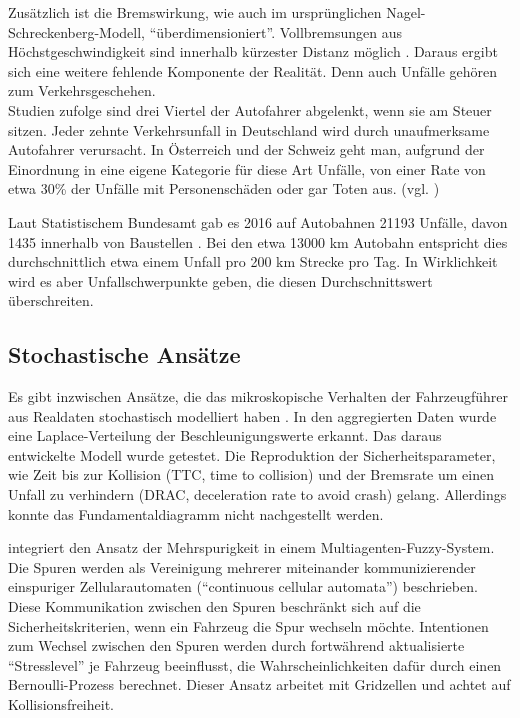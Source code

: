 Zusätzlich ist die Bremswirkung, wie auch im ursprünglichen Nagel-Schreckenberg-Modell, \enquote{über\-di\-men\-sio\-niert}. 
Vollbremsungen aus Höchstgeschwindigkeit sind innerhalb kürzester Distanz möglich \cite{acc-free}.
Daraus ergibt sich eine weitere fehlende Komponente der Realität.
Denn auch Unfälle gehören zum Verkehrsgeschehen. \\
Studien zufolge sind drei Viertel der Autofahrer abgelenkt, wenn sie am Steuer sitzen. 
Jeder zehnte Verkehrsunfall in Deutschland wird durch unaufmerksame Autofahrer verursacht. 
In Österreich und der Schweiz geht man, aufgrund der Einordnung in eine eigene Kategorie für diese Art Unfälle, von einer Rate von etwa 30\% der Unfälle mit Personenschäden oder gar Toten aus. (vgl. \cite{dvr-studie})

Laut Statistischem Bundesamt gab es 2016 auf Autobahnen 21193 Unfälle, davon 1435 innerhalb von Baustellen \cite{unf2016}. 
Bei den etwa 13000 km Autobahn \cite{autob2016} entspricht dies durchschnittlich etwa einem Unfall pro 200 km Strecke pro Tag. 
In Wirklichkeit wird es aber Unfallschwerpunkte geben, die diesen Durchschnittswert überschreiten.



\subsection*{Stochastische Ansätze}
\label{sec:stochastic-approaches}

Es gibt inzwischen Ansätze, die das mikroskopische Verhalten der Fahrzeugführer aus Realdaten  stochastisch modelliert haben \cite{stoch-carfollow}. 
In den aggregierten Daten wurde eine Laplace-Verteilung der Beschleunigungswerte erkannt. 
Das daraus entwickelte Modell wurde getestet. 
Die Reproduktion der Sicherheitsparameter, wie Zeit bis zur Kollision (TTC, time to collision) und der Bremsrate um einen Unfall zu verhindern (DRAC, deceleration rate to avoid crash) gelang. 
Allerdings konnte das Fundamentaldiagramm nicht nachgestellt werden.

\cite{multi-fuzzy} integriert den Ansatz der Mehrspurigkeit in einem Multiagenten-Fuzzy-System. 
Die Spuren werden als Vereinigung mehrerer miteinander kommunizierender einspuriger Zellularautomaten (\enquote{continuous cellular automata}) beschrieben. 
Diese Kommunikation zwischen den Spuren beschränkt sich auf die Sicherheitskriterien, wenn ein Fahrzeug die Spur wechseln möchte. 
Intentionen zum Wechsel zwischen den Spuren werden durch fortwährend aktualisierte \enquote{Stresslevel} je Fahrzeug beeinflusst, die Wahrscheinlichkeiten dafür durch einen Bernoulli-Prozess berechnet.
Dieser Ansatz arbeitet mit Gridzellen und achtet auf Kollisionsfreiheit.



